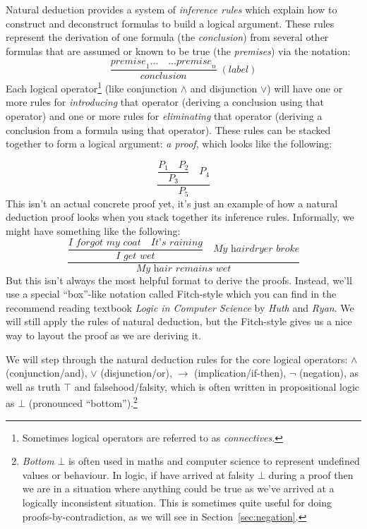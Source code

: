 \documentclass{article}
\theoremstyle{definition}
\begin{document}
Natural deduction provides a system of \emph{inference rules} which
explain how to construct and deconstruct formulas to build
a logical argument. These rules represent the derivation of one formula
(the \emph{conclusion}) from several other formulas that are assumed or known to be true
(the \emph{premises}) via the notation:
%
\begin{equation*}
  \dfrac{\textit{premise}_1 \ldots \quad \ldots \textit{premise}_n}
        {\textit{conclusion}}
    \; {(\textit{label})}
\end{equation*}
%
Each logical operator\footnote{Sometimes logical operators are
  referred to as \emph{connectives}.} (like conjunction $\wedge$ and
disjunction $\vee$) will have one or more rules for \emph{introducing}
that operator (deriving a conclusion using that operator) and one or
more rules for \emph{eliminating} that operator (deriving a conclusion from a formula
using that operator). These rules can be stacked together to form a
logical argument: \emph{a proof}, which looks like the following:

\begin{equation*}
\dfrac{\dfrac{P_1 \quad P_2}{P_3} \quad P_4}{P_5}
\end{equation*}
%
This isn't an actual concrete proof yet, it's just an example of how
a natural deduction proof looks when you stack together
its inference rules. Informally, we might have something like the
following:
%
\begin{equation*}
\dfrac{\dfrac{\textit{I forgot my coat} \quad \textit{It's
      raining}}{\textit{I get wet}} \quad \textit{My hairdryer broke}}
       {\textit{My hair remains wet}}
\end{equation*}
%
But this isn't always the most helpful format to derive the
proofs. Instead, we'll use a special ``box''-like notation called
Fitch-style which you can find in the recommend reading textbook
\emph{Logic in Computer Science} by \emph{Huth} and \emph{Ryan}.
We will still apply the rules of natural deduction, but the Fitch-style
gives us a nice way to layout the proof as we are deriving it.

We will step through the natural deduction rules for the core logical
operators: $\wedge$ (conjunction/and), $\vee$ (disjunction/or),
$\rightarrow$ (implication/if-then), $\neg$ (negation), as well as
truth $\top$ and falsehood/falsity, which is often written in
propositional logic as $\bot$ (pronounced
``bottom'').\footnote{\emph{Bottom} $\bot$ is often used in maths and
  computer science to represent undefined values or behaviour. In
  logic, if have arrived at falsity $\bot$ during a proof then we are
  in a situation where anything could be true as we've arrived at a
  logically inconsistent situation. This is sometimes quite useful for
  doing proofs-by-contradiction, as we will see in
  Section~\ref{sec:negation}.}
\end{document}
